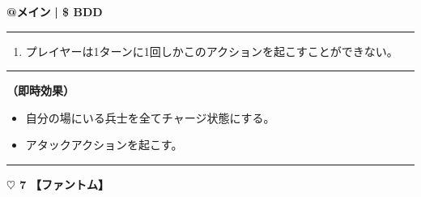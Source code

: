 \documentclass[twocolumn,a5paper,papersize,10pt]{jarticle}
\begin{document}
\begin{tcolorbox}[title={\small\bf【Action】追撃}{\scriptsize （通常魔法）}]

{\scriptsize\bf @メイン }
  {\scriptsize\bf | \$ BDD }

\vspace{1mm} %
\hrule height 0.1mm depth 0mm width 62mm %
\vspace{1mm} %


\vspace{-1zh}%
\begin{enumerate}
\renewcommand{\labelenumi}{※}
\setlength{\leftskip}{-0.3cm}
\setlength{\itemsep}{0pt} %
\setlength{\parskip}{0pt} %

\item プレイヤーは1ターンに1回しかこのアクションを起こすことができない。

\vspace{-3mm}%
\end{enumerate}
\vspace{-2mm} %
\vspace{1zh}%
\vspace{1mm} %
\hrule height 0.1mm depth 0mm width 62mm %
\vspace{1mm} %

{\bf（即時効果）}


\vspace{-1zh}%
\begin{itemize}
\setlength{\leftskip}{-0.3cm}
\setlength{\parskip}{0pt} %

\item 自分の場にいる兵士を全てチャージ状態にする。

\item アタックアクションを起こす。
\vspace{-1zh}%
\end{itemize}

\vspace{1mm} %
\end{tcolorbox}

\vspace{-1zh}

 
 
 
 
 

\vspace{3mm} %
\hrule height 0.5mm depth 0mm width 66.5mm %
\vspace{1mm} %
{\Large\bf $\heartsuit$ 7} {\normalsize\bf【ファントム】} %
\vspace{1mm} %
\end{document}
